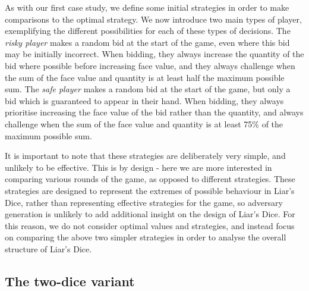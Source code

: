 
As with our first case study, we define some initial strategies in order to make comparisons to the optimal strategy. We now introduce two main types of player, exemplifying the different possibilities for each of these types of decisions. The \emph{risky player} makes a random bid at the start of the game, even where this bid may be initially incorrect. When bidding, they always increase the quantity of the bid where possible before increasing face value, and they always challenge when the sum of the face value and quantity is at least half the maximum possible sum. The \emph{safe player} makes a random bid at the start of the game, but only a bid which is guaranteed to appear in their hand. When bidding, they always prioritise increasing the face value of the bid rather than the quantity, and always challenge when the sum of the face value and quantity is at least 75\% of the maximum possible sum.

It is important to note that these strategies are deliberately very simple, and unlikely to be effective. This is by design - here we are more interested in comparing various rounds of the game, as opposed to different strategies. These strategies are designed to represent the extremes of possible behaviour in Liar's Dice, rather than representing effective strategies for the game, so adversary generation is unlikely to add additional insight on the design of Liar's Dice. For this reason, we do not consider optimal values and strategies, and instead focus on comparing the above two simpler strategies in order to analyse the overall structure of Liar's Dice.

\subsection{The two-dice variant}

